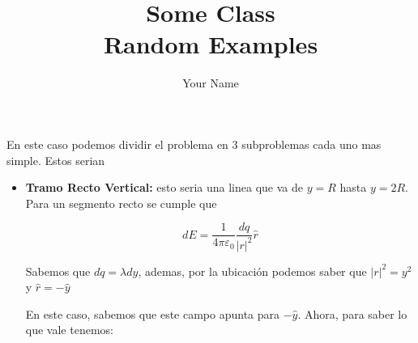 \documentclass{report}
\title{\Huge{Some Class}\\Random Examples}
\author{\huge{Your Name}}
\date{}
\begin{document}
\maketitle
\newpage%
\tableofcontents
\pagebreak

\chapter{}

En este caso podemos dividir el problema en 3 subproblemas cada uno mas simple. Estos serian

\begin{itemize}
	\item \textbf{Tramo Recto Vertical:} esto seria una linea que va de $y = R$ hasta $y = 2R$. Para un segmento recto
		se cumple que

		$$ dE = \frac{1}{4\pi\varepsilon_0}\frac{dq}{\left|r\right|^2} \hat{r} $$


		Sabemos que $dq = \lambda dy$, ademas, por la ubicación podemos saber que $\left|r\right|^2 = y^2$ y $\hat{r} = - \hat{y}$

		En este caso, sabemos que este campo apunta para $-\hat{y}$. Ahora, para saber lo que vale tenemos:


\end{itemize}
\end{document}
